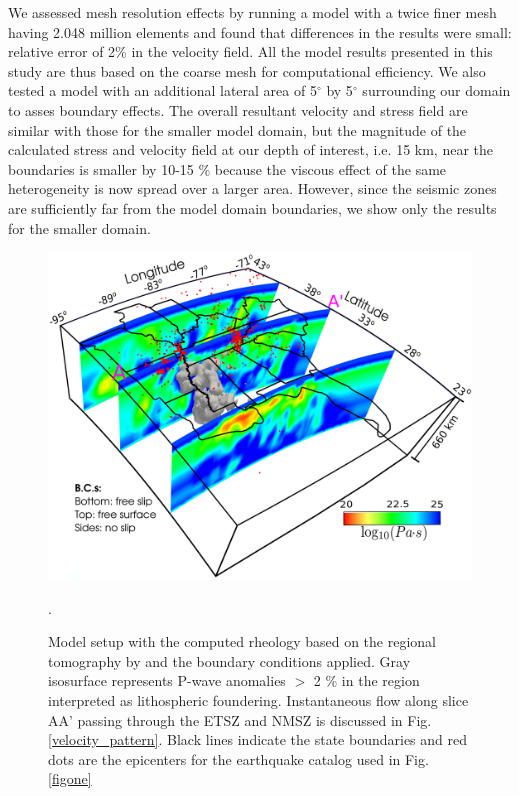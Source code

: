 \documentclass[draft,linenumbers]{agujournal2018}
\begin{document}
We assessed mesh resolution effects by running a model with a twice finer mesh having 2.048 million elements and found that differences in the results were small: relative error of 2\% in the velocity field. All the model results presented in this study are thus based on the coarse mesh for computational efficiency. We also tested a model with an additional lateral area of 5$^{\circ}$ by 5$^{\circ}$ surrounding our domain to asses boundary effects. The overall resultant velocity and stress field are similar with those for the smaller model domain, but the magnitude of the calculated stress and velocity field at our depth of interest, i.e. 15 km, near the boundaries is smaller by 10-15 \% because the viscous effect of the same heterogeneity is now spread over a larger area. However, since the seismic zones are sufficiently far from the model domain boundaries, we show only the results for the smaller domain.
%
\begin{figure}[ht]
    \centering
    \includegraphics[width=0.75\linewidth]{figures/model_figure.png}
    \caption{Model setup with the computed rheology based on the regional tomography by \citet{Biryol_2016} and the boundary conditions applied. Gray isosurface represents P-wave anomalies $>$ 2 \% in the region interpreted as lithospheric foundering. Instantaneous flow along slice AA' passing through the ETSZ and NMSZ is discussed in Fig. \ref{velocity_pattern}. Black lines indicate the state boundaries and red dots are the epicenters for the earthquake catalog used in Fig. \ref{figone}}.
    \label{fig_model}
\end{figure}
\end{document}
